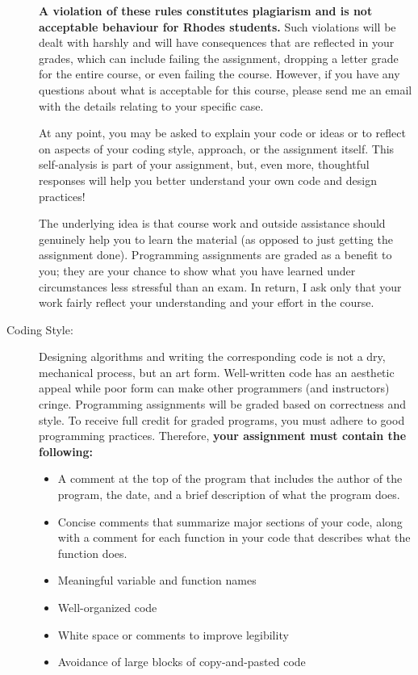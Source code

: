 \documentclass [letterpaper,11pt]{article}
\begin{document}
\begin{description}
\textbf{A violation of these rules constitutes plagiarism and is not acceptable behaviour for Rhodes
students.} Such violations will be dealt with harshly and will have consequences that are
reflected in your grades, which can include failing the assignment, dropping a letter grade for
the entire course, or even failing the course. However, if you have any questions about what
is acceptable for this course, please send me an email with the details relating to your specific
case.

At any point, you may be asked to explain your code or ideas or to reflect on aspects of your
coding style, approach, or the assignment itself. This self-analysis is part of your assignment,
but, even more, thoughtful responses will help you better understand your own code and
design practices!

The underlying idea is that course work and outside assistance should genuinely help you to
learn the material (as opposed to just getting the assignment done). Programming assignments
are graded as a benefit to you; they are your chance to show what you have learned
under circumstances less stressful than an exam. In return, I ask only that your work fairly
reflect your understanding and your effort in the course.

\item[Coding Style:]
Designing algorithms and writing the corresponding code is not a dry, mechanical process, but an art form.  Well-written code has an aesthetic appeal while poor form can make other programmers (and instructors) cringe. Programming assignments will be graded based on correctness and style. To receive full credit for graded programs, you must adhere to good programming practices. Therefore, \textbf{your assignment must contain the following:}
\begin{itemize}\setlength{\itemsep}{0em}\setlength{\parskip}{0pt}
	\item A comment at the top of the program that includes the author of the program,
	the date, and a brief description of what the program does.
	\item Concise comments that summarize major sections of your code, along with a comment
	for each function in your code that describes what the function does.
	\item Meaningful variable and function names
	\item Well-organized code
	\item White space or comments to improve legibility
	\item Avoidance of large blocks of copy-and-pasted code
\end{itemize}


\end{description}
\end{document}
